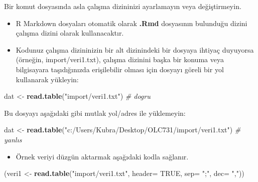 \documentclass[
  oneside]{book}
\newenvironment{Shaded}{\begin{snugshade}}{\end{snugshade}}
\newcommand{\AttributeTok}[1]{\textcolor[rgb]{0.13,0.29,0.53}{#1}}
\newcommand{\CommentTok}[1]{\textcolor[rgb]{0.56,0.35,0.01}{\textit{#1}}}
\newcommand{\ConstantTok}[1]{\textcolor[rgb]{0.56,0.35,0.01}{#1}}
\newcommand{\FunctionTok}[1]{\textcolor[rgb]{0.13,0.29,0.53}{\textbf{#1}}}
\newcommand{\NormalTok}[1]{#1}
\newcommand{\OtherTok}[1]{\textcolor[rgb]{0.56,0.35,0.01}{#1}}
\newcommand{\StringTok}[1]{\textcolor[rgb]{0.31,0.60,0.02}{#1}}
\providecommand{\tightlist}{%
  \setlength{\itemsep}{0pt}\setlength{\parskip}{0pt}}
\begin{document}
\begin{warning}
Bir komut dosyasında asla çalışma dizininizi ayarlamayın veya değiştirmeyin.

\end{warning}

\begin{itemize}
\item
  R Markdown dosyaları otomatik olarak \textbf{.Rmd} dosyasının bulunduğu dizini çalışma dizini olarak kullanacaktır.
\item
  Kodunuz çalışma dizininizin bir alt dizinindeki bir dosyaya ihtiyaç duyuyorsa (örneğin, import/veri1.txt), çalışma dizinini başka bir konuma veya bilgisayara taşıdığınızda erişilebilir olması için dosyayı göreli bir yol kullanarak yükleyin:
\end{itemize}

\begin{Shaded}
\begin{Highlighting}[]
\NormalTok{dat }\OtherTok{\textless{}{-}} \FunctionTok{read.table}\NormalTok{(}\StringTok{"import/veri1.txt"}\NormalTok{)  }\CommentTok{\# dogru}
\end{Highlighting}
\end{Shaded}

Bu dosyayı aşağıdaki gibi mutlak yol/adres ile yüklemeyin:

\begin{Shaded}
\begin{Highlighting}[]
\NormalTok{dat }\OtherTok{\textless{}{-}} \FunctionTok{read.table}\NormalTok{(}\StringTok{"c:/Users/Kubra/Desktop/OLC731/import/veri1.txt"}\NormalTok{)  }\CommentTok{\# yanlıs}
\end{Highlighting}
\end{Shaded}

\begin{itemize}
\tightlist
\item
  Örnek veriyi düzgün aktarmak aşağıdaki kodla sağlanır.
\end{itemize}

\begin{Shaded}
\begin{Highlighting}[]
\NormalTok{(veri1 }\OtherTok{\textless{}{-}} \FunctionTok{read.table}\NormalTok{(}\StringTok{"import/veri1.txt"}\NormalTok{,}
                    \AttributeTok{header=} \ConstantTok{TRUE}\NormalTok{,}
                    \AttributeTok{sep=} \StringTok{";"}\NormalTok{,}
                    \AttributeTok{dec=} \StringTok{","}\NormalTok{))}
\end{Highlighting}
\end{Shaded}
\end{document}
